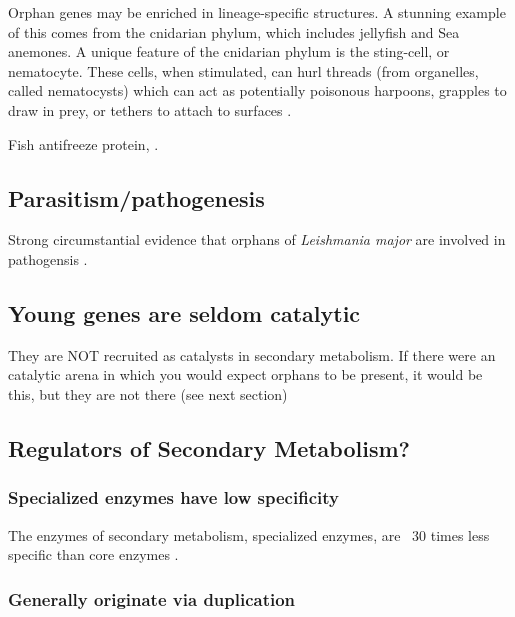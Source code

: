     Orphan genes may be enriched in lineage-specific structures. A stunning
    example of this comes from the cnidarian phylum, which includes jellyfish
    and Sea anemones. A unique feature of the cnidarian phylum is the
    sting-cell, or nematocyte. These cells, when stimulated, can hurl threads
    (from organelles, called nematocysts) which can act as potentially
    poisonous harpoons, grapples to draw in prey, or tethers to attach to
    surfaces \cite{kass-simon_behavioral_2002}.

    Fish antifreeze protein, \cite{chen_evolution_1997}.


\subsection{Parasitism/pathogenesis}

  Strong circumstantial evidence that orphans of \textit{Leishmania major} are
  involved in pathogensis \cite{mukherjee_elucidating_2015}.

\subsection{Young genes are seldom catalytic}

    They are NOT recruited as catalysts in secondary metabolism. If there were
    an catalytic arena in which you would expect orphans to be present, it
    would be this, but they are not there (see next section)

\subsection{Regulators of Secondary Metabolism?}

\subsubsection{Specialized enzymes have low specificity}

    The enzymes of secondary metabolism, specialized enzymes, are ~30 times
    less specific than core enzymes \cite{bar-even_moderately_2011}.

\subsubsection{Generally originate via duplication}

